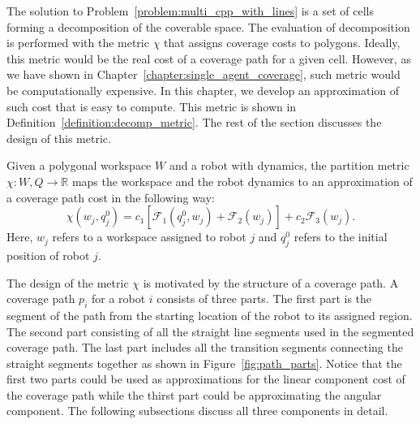\documentclass[../main.tex]{subfiles}
\begin{document}

The solution to Problem~\ref{problem:multi_cpp_with_lines} is a set of cells forming a decomposition of the coverable space. The evaluation of decomposition is performed with the metric $\chi$ that assigns coverage costs to polygons. Ideally, this metric would be the real cost of a coverage path for a given cell. However, as we have shown in Chapter~\ref{chapter:single_agent_coverage}, such metric would be computationally expensive. In this chapter, we develop an approximation of such cost that is easy to compute. This metric is shown in Definition~\ref{definition:decomp_metric}. The rest of the section discusses the design of this metric. 

\begin{definition}
\label{definition:decomp_metric}
Given a polygonal workspace $W$ and a robot with dynamics, the partition metric $\chi:W,Q\to\mathbb{R}$ maps the workspace and the robot dynamics to an approximation of a coverage path cost in the following way:
	\begin{equation}
		\chi(w_j,q_j^0)=c_1[\mathcal{F}_1(q^0_j,w_j)+\mathcal{F}_2(w_j)]+c_2\mathcal{F}_3(w_j).
	\end{equation}
Here, $w_j$ refers to a workspace assigned to robot $j$ and $q^0_j$ refers to the initial position of robot $j$.
\end{definition}

\begin{remark}
The design of the metric $\chi$ is motivated by the structure of a coverage path. A coverage path $p_i$ for a robot $i$ consists of three parts. The first part is the segment of the path from the starting location of the robot to its assigned region. The second part consisting of all the straight line segments used in the segmented coverage path. The last part includes all the transition segments connecting the straight segments together as shown in Figure~\ref{fig:path_parts}. Notice that the first two parts could be used as approximations for the linear component cost of the coverage path while the thirst part could be approximating the angular component. The following subsections discuss all three components in detail. \RE
\end{remark}
\end{document}
